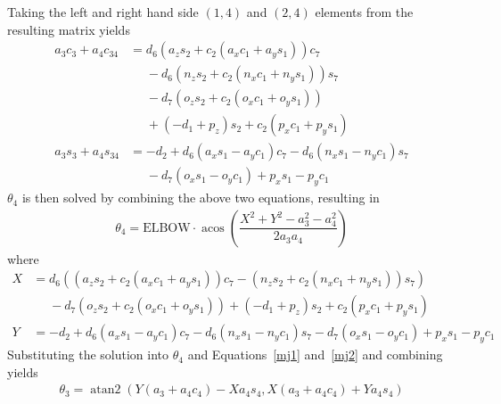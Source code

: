 \documentclass{article}
\DeclareMathOperator{\atantwo}{atan2}
\DeclareMathOperator{\acos}{acos}
\begin{document}
Taking the left and right hand side $\left(1, 4\right)$ and $\left(2, 4 \right)$ elements from the resulting matrix yields
\begin{align}
a_{3} c_{3} + a_{4} c_{34} &= d_{6} \left(a_{z} s_{2} + c_{2}\left(a_{x} c_{1} + a_{y} s_{1}\right) \right) c_{7} \nonumber \\
                           &\phantom{=} - d_{6} \left(n_{z} s_{2} + c_{2}\left(n_{x} c_{1} + n_{y} s_{1} \right) \right) s_{7}  \nonumber \\
                           &\phantom{=} - d_{7} \left(o_{z} s_{2} + c_{2}\left(o_{x} c_{1} + o_{y} s_{1} \right) \right) \nonumber \\
                           &\phantom{=}+ \left(- d_{1} + p_{z}\right) s_{2} + c_{2}\left(p_{x} c_{1} + p_{y} s_{1}\right) \label{mj1} \\
a_{3} s_{3} + a_{4} s_{34} &= - d_{2} + d_{6} \left(a_{x} s_{1} - a_{y} c_{1}\right) c_{7} - d_{6} \left(n_{x} s_{1} - n_{y} c_{1}\right) s_{7} \nonumber \\
                           &\phantom{=} - d_{7} \left(o_{x} s_{1} - o_{y} c_{1}\right) + p_{x} s_{1} - p_{y} c_{1} \label{mj2}
\end{align}
$\theta_4$ is then solved by combining the above two equations, resulting in
\begin{align}
\boxed{\theta_4 = \mbox{ELBOW} \cdot \acos \left( \dfrac{X^2 + Y^2 - a_3^2 - a_4^2}{2 a_3 a_4} \right)}
\end{align}
where
\begin{align*}
X &= d_{6} \left( \left(a_{z} s_{2} + c_{2}\left(a_{x} c_{1} + a_{y} s_{1}\right) \right) c_{7} - \left(n_{z} s_{2} + c_{2}\left(n_{x} c_{1} + n_{y} s_{1} \right) \right) s_{7} \right) \nonumber \\
  &\phantom{=}- d_{7} \left(o_{z} s_{2} + c_{2}\left(o_{x} c_{1} + o_{y} s_{1} \right) \right) + \left(- d_{1} + p_{z}\right) s_{2} + c_{2}\left(p_{x} c_{1} + p_{y} s_{1}\right) \\
Y &= - d_{2} + d_{6} \left(a_{x} s_{1} - a_{y} c_{1}\right) c_{7} - d_{6} \left(n_{x} s_{1} - n_{y} c_{1}\right) s_{7} - d_{7} \left(o_{x} s_{1} - o_{y} c_{1}\right) + p_{x} s_{1} - p_{y} c_{1}
\end{align*}
Substituting the solution into $\theta_4$ and Equations~\ref{mj1} and~\ref{mj2} and combining yields
\begin{align*}
\boxed{\theta_3 = \atantwo \left(Y \left( a_3 + a_4 c_4 \right) - X a_4 s_4, X \left(a_3 + a_4 c_4 \right) + Y a_4 s_4 \right)}
\end{align*}
\end{document}
